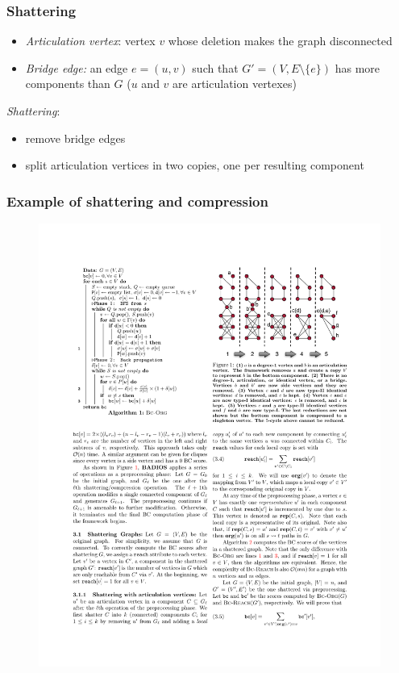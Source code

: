 \begin{frame}
  \frametitle{Shattering}
  \vfill
  \begin{itemize}
    \item \emph{Articulation vertex}: vertex $v$ whose deletion makes the graph disconnected
    \item \emph{Bridge edge:} an edge $e=(u,v)$ such that $G'=(V,E\setminus\{e\})$ has
      more components than $G$ ($u$ and $v$ are articulation vertexes)
  \end{itemize}
  \pause
  \vfill
  \emph{Shattering}:
  \begin{itemize}
    \item remove bridge edges
    \item split articulation vertices in two copies, one per resulting component
  \end{itemize}
\end{frame}

\begin{frame}
  \frametitle{Example of shattering and compression}
  \begin{figure}
    \includegraphics{figs/shatteringbadios.pdf}
  \end{figure}
\end{frame}

